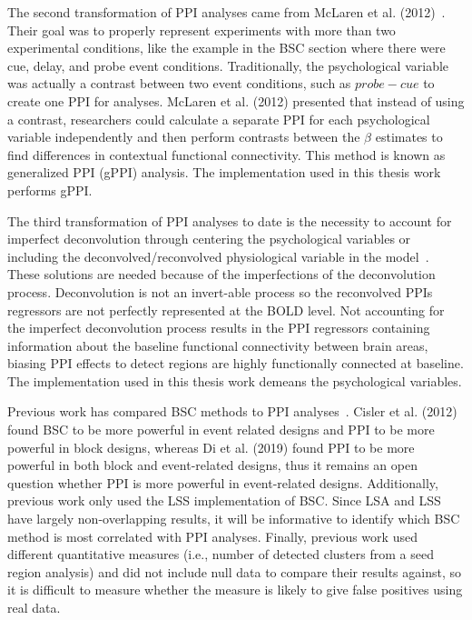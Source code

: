 \documentclass[phd,appendix,figures]{uithesis}
\begin{document}
The second transformation of PPI analyses came from McLaren et al. (2012)~\cite{McLaren2012}.
Their goal was to properly represent experiments with more than two experimental conditions, like
the example in the BSC section where there were cue, delay, and probe event conditions.
Traditionally, the psychological variable was actually a contrast between two event conditions, such as
$probe - cue$ to create one PPI for analyses.
McLaren et al. (2012) presented that instead of using a contrast, researchers could
calculate a separate PPI for each psychological variable independently and then
perform contrasts between the $\beta$ estimates to find differences in contextual functional connectivity.
This method is known as generalized PPI (gPPI) analysis.
The implementation used in this thesis work performs gPPI.

The third transformation of PPI analyses to date is the necessity to account for imperfect deconvolution
through centering the psychological variables or including the deconvolved/reconvolved physiological variable
in the model~\cite{Di2017}.
These solutions are needed because of the imperfections of the deconvolution process.
Deconvolution is not an invert-able process so the reconvolved PPIs regressors are not
perfectly represented at the BOLD level.
Not accounting for the imperfect deconvolution process results in the PPI regressors
containing information about the baseline functional connectivity between brain areas, biasing
PPI effects to detect regions are highly functionally connected at baseline.
The implementation used in this thesis work demeans the psychological variables.

Previous work has compared BSC methods to PPI analyses~\cite{Cisler2012,Di2019}.
Cisler et al. (2012) found BSC to be more powerful in event related designs
and PPI to be more powerful in block designs, whereas Di et al. (2019)
found PPI to be more powerful in both block and event-related designs,
thus it remains an open question whether PPI is more powerful in
event-related designs.
Additionally, previous work only used the LSS implementation of BSC.
Since LSA and LSS have largely non-overlapping results, it will be informative
to identify which BSC method is most correlated with PPI analyses.
Finally, previous work used different quantitative measures
(i.e., number of detected clusters from a seed region analysis)
and did not include null data to compare their results against, so it is
difficult to measure whether the measure is likely to give false positives
using real data.
\end{document}
